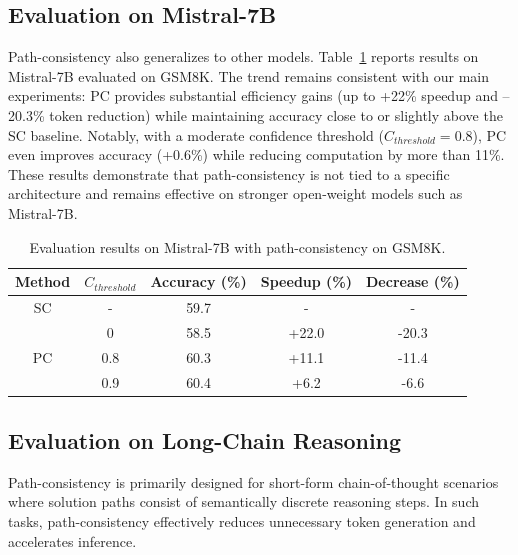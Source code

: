 \subsection{Evaluation on Mistral-7B}
\label{app:mistral}
Path-consistency also generalizes to other models. Table~\ref{tab:mistral7b} reports results on Mistral-7B evaluated on GSM8K. The trend remains consistent with our main experiments: PC provides substantial efficiency gains (up to +22\% speedup and –20.3\% token reduction) while maintaining accuracy close to or slightly above the SC baseline. Notably, with a moderate confidence threshold ($C_{threshold}=0.8$), PC even improves accuracy (+0.6\%) while reducing computation by more than 11\%. These results demonstrate that path-consistency is not tied to a specific architecture and remains effective on stronger open-weight models such as Mistral-7B.
\begin{table}[h]
    \caption{Evaluation results on Mistral-7B with path-consistency on GSM8K.}
    \label{tab:mistral7b}
    \centering
    \begin{tabular}{@{}ccccc@{}}
    \toprule
    \multicolumn{1}{l}{Method} & \multicolumn{1}{l}{$C_{threshold}$} & \multicolumn{1}{l}{Accuracy (\%)} & \multicolumn{1}{l}{Speedup (\%)} & \multicolumn{1}{l}{Decrease (\%)} \\ \midrule
    SC                         & -                                   & 59.7                              & -                                & -                                \\ \midrule
    \multirow{3}{*}{PC}        & 0                                   & 58.5                              & +22.0                            & -20.3                            \\ 
                             & 0.8                                 & 60.3                              & +11.1                            & -11.4                            \\ 
                             & 0.9                                 & 60.4                              & +6.2                             & -6.6                            \\ \bottomrule
    \end{tabular}
\end{table}

\subsection{Evaluation on Long-Chain Reasoning}
\label{app:long-chain}
Path-consistency is primarily designed for short-form chain-of-thought scenarios where solution paths consist of semantically discrete reasoning steps. In such tasks, path-consistency effectively reduces unnecessary token generation and accelerates inference. 


